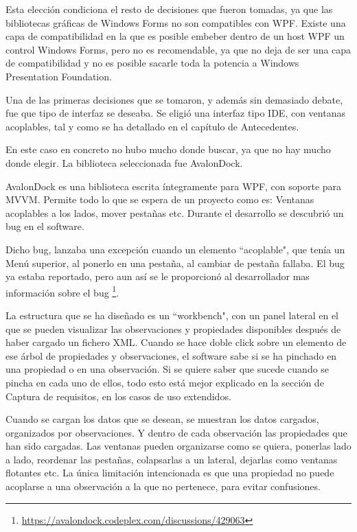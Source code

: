 Esta elecci\'on condiciona el resto de decisiones que fueron tomadas, ya que las bibliotecas gr\'aficas
de Windows Forms no son compatibles con WPF. Existe una capa de compatibilidad en la que es posible embeber dentro
de un host WPF un control Windows Forms, pero no es recomendable, ya que no deja de ser una capa de compatibilidad y
no es posible sacarle toda la potencia a Windows Presentation Foundation.

Una de las primeras decisiones que se tomaron, y adem\'as sin demasiado debate, fue que tipo de interfaz se deseaba.
Se eligi\'o una interfaz tipo IDE, con ventanas acoplables, tal y como se ha detallado en el cap\'itulo de Antecedentes.

En este caso en concreto no hubo mucho donde buscar, ya que no hay mucho donde elegir. La biblioteca seleccionada
fue AvalonDock.

AvalonDock es una biblioteca escrita \'integramente para WPF, con soporte para MVVM. Permite todo lo que se espera
de un proyecto como es: Ventanas acoplables a los lados, mover pesta\~nas etc. Durante el desarrollo se descubri\'o
un bug en el software.

Dicho bug, lanzaba una excepci\'on cuando un elemento ``acoplable", que ten\'ia un Men\'u superior, al ponerlo
en una pesta\~na, al cambiar de pesta\~na fallaba. El bug ya estaba reportado, pero aun as\'i se le proporcion\'o
al desarrollador mas informaci\'on sobre el bug \footnote{\url{https://avalondock.codeplex.com/discussions/429063}}.

La estructura que se ha dise\~nado es un ``workbench", con un panel lateral en el que se pueden visualizar las observaciones
y propiedades disponibles despu\'es de haber cargado un fichero XML. Cuando se hace doble click sobre un elemento
de ese \'arbol de propiedades y observaciones, el software sabe si se ha pinchado en una propiedad o en una observaci\'on.
Si se quiere saber que sucede cuando se pincha en cada uno de ellos, todo esto est\'a mejor explicado en la secci\'on de
Captura de requisitos, en los casos de uso extendidos.

Cuando se cargan los datos que se desean, se muestran los datos cargados, organizados por observaciones. Y dentro de cada
observaci\'on las propiedades que han sido cargadas. Las ventanas pueden organizarse como se quiera, ponerlas lado a lado,
reordenar las pesta\~nas, colapsarlas a un lateral, dejarlas como ventanas flotantes etc. 
La \'unica limitaci\'on intencionada es que una propiedad no puede acoplarse a una observaci\'on a la que no pertenece,
para evitar confusiones.

